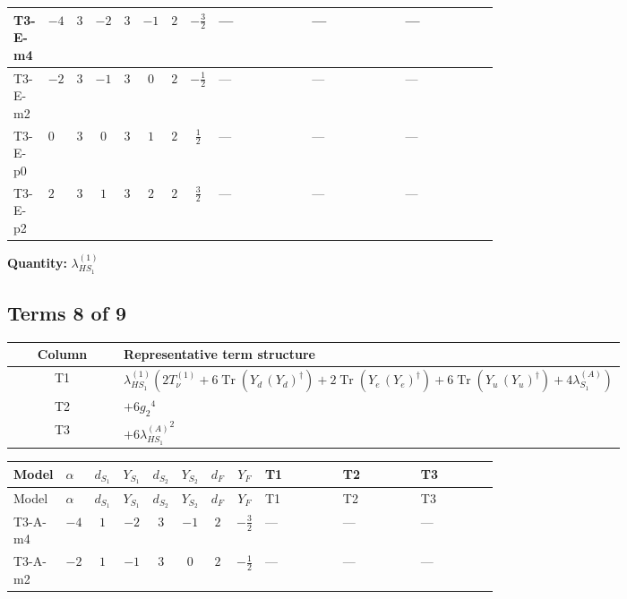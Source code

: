 \documentclass[8pt]{article}
\begin{document}
\begin{landscape}
\begin{longtable}{@{}llcccccc >{\raggedright\arraybackslash}p{0.21\linewidth} >{\raggedright\arraybackslash}p{0.21\linewidth} >{\raggedright\arraybackslash}p{0.21\linewidth}@{}}
\midrule
T3-E-m4 & $-4$ & $3$ & $-2$ & $3$ & $-1$ & $2$ & $-\frac{3}{2}$ & --- & --- & --- \\
\midrule
T3-E-m2 & $-2$ & $3$ & $-1$ & $3$ & $0$ & $2$ & $-\frac{1}{2}$ & --- & --- & --- \\
\midrule
T3-E-p0 & $0$ & $3$ & $0$ & $3$ & $1$ & $2$ & $\frac{1}{2}$ & --- & --- & --- \\
\midrule
T3-E-p2 & $2$ & $3$ & $1$ & $3$ & $2$ & $2$ & $\frac{3}{2}$ & --- & --- & --- \\
\midrule
\bottomrule
\end{longtable}
\clearpage
\noindent\textbf{Quantity: }$\lambda_{HS_1}^{(1)}$\par\smallskip
\subsection*{Terms 8 of 9}
\begin{center}
\begin{tabular}{@{}c >{\raggedright\arraybackslash}p{0.82\linewidth}@{}}
\toprule
Column & Representative term structure \\
\midrule
T1 & \(\displaystyle {\lambda_{HS_1}^{(1)}} (2 T_{\nu}^{(1)}+6 \operatorname{Tr}\!\left({Y_d}\,\left({Y_d}\right)^{\dagger}\right)+2 \operatorname{Tr}\!\left({Y_e}\,\left({Y_e}\right)^{\dagger}\right)+6 \operatorname{Tr}\!\left({Y_u}\,\left({Y_u}\right)^{\dagger}\right)+4 {\lambda_{S_1}^{(A)}})\) \\
\midrule
T2 & \(\displaystyle +6 {g_2}^4\) \\
\midrule
T3 & \(\displaystyle +6 {\lambda_{HS_1}^{(A)}}^2\) \\
\midrule
\bottomrule
\end{tabular}
\end{center}
\smallskip
\tiny
\begin{longtable}{@{}llcccccc >{\raggedright\arraybackslash}p{0.21\linewidth} >{\raggedright\arraybackslash}p{0.21\linewidth} >{\raggedright\arraybackslash}p{0.21\linewidth}@{}}
\toprule
Model & $\alpha$ & $d_{S_1}$ & $Y_{S_1}$ & $d_{S_2}$ & $Y_{S_2}$ & $d_F$ & $Y_F$ & T1 & T2 & T3 \\
\midrule
\endfirsthead
\toprule
Model & $\alpha$ & $d_{S_1}$ & $Y_{S_1}$ & $d_{S_2}$ & $Y_{S_2}$ & $d_F$ & $Y_F$ & T1 & T2 & T3 \\
\midrule
\endhead
T3-A-m4 & $-4$ & $1$ & $-2$ & $3$ & $-1$ & $2$ & $-\frac{3}{2}$ & --- & --- & --- \\
\midrule
T3-A-m2 & $-2$ & $1$ & $-1$ & $3$ & $0$ & $2$ & $-\frac{1}{2}$ & --- & --- & --- \\

\end{longtable}
\end{landscape}
\end{document}
